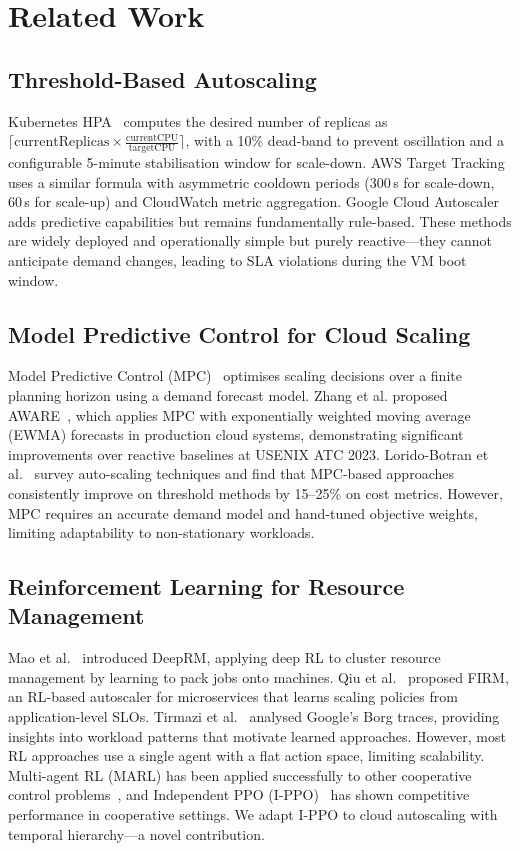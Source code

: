 \documentclass[conference]{IEEEtran}
\begin{document}
\section{Related Work}

\subsection{Threshold-Based Autoscaling}

Kubernetes HPA~\cite{k8s_hpa} computes the desired number of replicas as
$\lceil \text{currentReplicas} \times \frac{\text{currentCPU}}{\text{targetCPU}}
\rceil$, with a 10\% dead-band to prevent oscillation and a configurable
5-minute stabilisation window for scale-down. AWS Target
Tracking~\cite{aws_autoscaling} uses a similar formula with asymmetric cooldown
periods (300\,s for scale-down, 60\,s for scale-up) and CloudWatch metric
aggregation. Google Cloud Autoscaler~\cite{google_autoscaler} adds predictive
capabilities but remains fundamentally rule-based.  These methods are widely
deployed and operationally simple but purely reactive---they cannot anticipate
demand changes, leading to SLA violations during the VM boot window.

\subsection{Model Predictive Control for Cloud Scaling}

Model Predictive Control (MPC)~\cite{garcia1989mpc} optimises scaling decisions
over a finite planning horizon using a demand forecast model.  Zhang et al.
proposed AWARE~\cite{zhang2023aware}, which applies MPC with exponentially
weighted moving average (EWMA) forecasts in production cloud systems,
demonstrating significant improvements over reactive baselines at USENIX ATC
2023.  Lorido-Botran et al.~\cite{lorido2014review} survey auto-scaling
techniques and find that MPC-based approaches consistently improve on threshold
methods by 15--25\% on cost metrics.  However, MPC requires an accurate demand
model and hand-tuned objective weights, limiting adaptability to non-stationary
workloads.

\subsection{Reinforcement Learning for Resource Management}

Mao et al.~\cite{mao2016resource} introduced DeepRM, applying deep RL to
cluster resource management by learning to pack jobs onto machines.  Qiu et
al.~\cite{qiu2020firm} proposed FIRM, an RL-based autoscaler for
microservices that learns scaling policies from application-level SLOs.
Tirmazi et al.~\cite{tirmazi2020borg} analysed Google's Borg traces,
providing insights into workload patterns that motivate learned approaches.
However, most RL approaches use a single agent with a flat action space,
limiting scalability.  Multi-agent RL (MARL) has been applied successfully
to other cooperative control problems~\cite{lowe2017multi}, and
Independent PPO (I-PPO)~\cite{dewitt2020independent} has shown competitive
performance in cooperative settings.  We adapt I-PPO to cloud autoscaling
with temporal hierarchy---a novel contribution.
\end{document}
